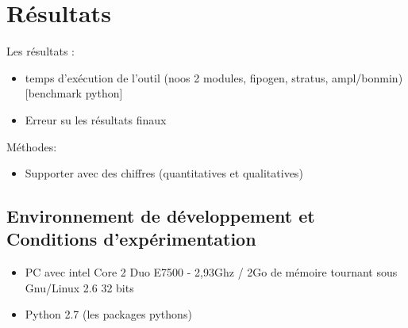 \chapter{Résultats}


Les résultats : \\
\begin{itemize}
\item temps d'exécution de l'outil (noos 2 modules, fipogen, stratus, ampl/bonmin) [benchmark python]
\item Erreur su les résultats finaux
\end{itemize}

Méthodes:\\
\begin{itemize}
\item Supporter avec des chiffres (quantitatives et qualitatives)
\end{itemize}

\section{Environnement de développement et Conditions d'expérimentation}

\begin{itemize}
\item PC avec intel Core 2 Duo E7500 - 2,93Ghz / 2Go de mémoire tournant sous Gnu/Linux 2.6 32 bits
\item Python 2.7 (les packages pythons)
\end{itemize}
